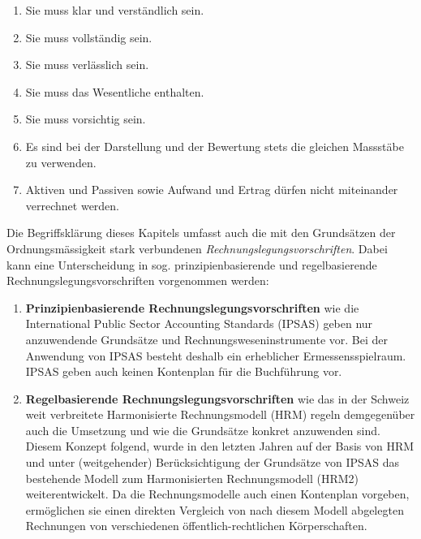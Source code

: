 \documentclass[10pt]{article}
\begin{document}
\begin{enumerate}
    \item Sie muss klar und verständlich sein.

    \item Sie muss vollständig sein.

    \item Sie muss verlässlich sein.

    \item Sie muss das Wesentliche enthalten.

    \item Sie muss vorsichtig sein.

    \item Es sind bei der Darstellung und der Bewertung stets die gleichen Massstäbe zu verwenden.

    \item Aktiven und Passiven sowie Aufwand und Ertrag dürfen nicht miteinander verrechnet werden.

\end{enumerate}

Die Begriffsklärung dieses Kapitels umfasst auch die mit den Grundsätzen der Ordnungsmässigkeit stark verbundenen \textit{Rechnungslegungsvorschriften}. Dabei kann eine Unterscheidung in sog. prinzipienbasierende und regelbasierende Rechnungslegungsvorschriften vorgenommen werden:

\begin{enumerate}
    \item \textbf{Prinzipienbasierende Rechnungslegungsvorschriften} wie die International Public Sector Accounting Standards (IPSAS) geben nur anzuwendende Grundsätze und Rechnungsweseninstrumente vor. Bei der Anwendung von IPSAS besteht deshalb ein erheblicher Ermessensspielraum. IPSAS geben auch keinen Kontenplan für die Buchführung vor.

    \item \textbf{Regelbasierende Rechnungslegungsvorschriften} wie das in der Schweiz weit verbreitete Harmonisierte Rechnungsmodell (HRM) regeln demgegenüber auch die Umsetzung und wie die Grundsätze konkret anzuwenden sind. Diesem Konzept folgend, wurde in den letzten Jahren auf der Basis von HRM und unter (weitgehender) Berücksichtigung der Grundsätze von IPSAS das bestehende Modell zum Harmonisierten Rechnungsmodell (HRM2) weiterentwickelt. Da die Rechnungsmodelle auch einen Kontenplan vorgeben, ermöglichen sie einen direkten Vergleich von nach diesem Modell abgelegten Rechnungen von verschiedenen öffentlich-rechtlichen Körperschaften.

\end{enumerate}
\end{document}
